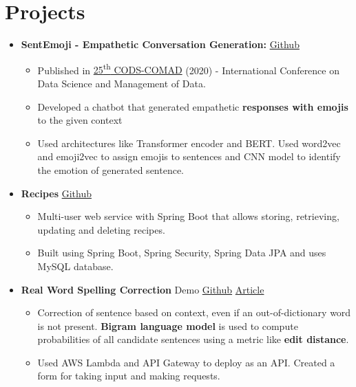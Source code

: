 \documentclass[letterpaper,11pt]{article}
\newcommand{\resumeItem}[1]{
    \item\small{
        {#1 \vspace{-2pt}}
    }
}
\newcommand{\resumeSubHeadingListStart}{\begin{itemize}[leftmargin=*]}
\newcommand{\resumeSubHeadingListEnd}{\end{itemize}}
\newcommand{\resumeItemListStart}{\begin{itemize}}
\newcommand{\resumeItemListEnd}{\end{itemize}\vspace{-5pt}}
\newcommand{\resumeProject}[1]{
  \vspace{-1pt}\item{#1}
    \vspace{-5pt}
}
\begin{document}
\section{Projects}
    \resumeSubHeadingListStart
        \resumeProject{\textbf{SentEmoji - Empathetic Conversation Generation:} \href{https://github.com/JatinDholakia/SentEmojiBot}{\color{blue}Github     }}
            \resumeItemListStart
                \resumeItem
                {Published in \href{https://dl.acm.org/doi/abs/10.1145/3371158.3371218}{\color{blue}25\textsuperscript{th} CODS-COMAD} (2020) - International Conference on Data Science and Management of Data.}
                \resumeItem
                {Developed a chatbot that generated empathetic \textbf{responses with emojis} to the given context}
                \resumeItem
                {Used architectures like Transformer encoder and BERT. Used word2vec and emoji2vec to assign emojis to sentences and CNN model to identify the emotion of generated sentence.}
            \resumeItemListEnd
        \resumeProject{\textbf{Recipes} \href{https://github.com/JatinDholakia/Recipes} {\color{blue}Github}}
            \resumeItemListStart
                \resumeItem
                {Multi-user web service with Spring Boot that allows storing, retrieving, updating and deleting recipes.}
                \resumeItem
                {Built using Spring Boot, Spring Security, Spring Data JPA and uses MySQL database.}
            \resumeItemListEnd
        \resumeProject{\textbf{Real Word Spelling Correction} Demo \href{https://github.com/JatinDholakia/Spelling-Correction}{\color{blue}Github} \href{https://medium.com/analytics-vidhya/real-word-spell-correction-c64a3a02c64d}{\color{blue}Article}}
            \resumeItemListStart
                \resumeItem
                {Correction of sentence based on context, even if an out-of-dictionary word is not present. \textbf{Bigram language model} is used to compute probabilities of all candidate sentences using a metric like \textbf{edit distance}.}
                \resumeItem
                {Used AWS Lambda and API Gateway to deploy as an API. Created a form for taking input and making requests.}
            \resumeItemListEnd
    \resumeSubHeadingListEnd
\end{document}
